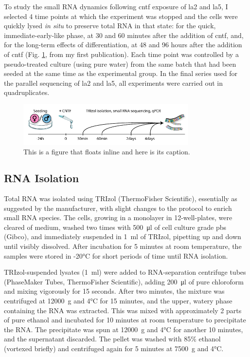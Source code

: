 To study the small RNA dynamics following \ac{cntf} exposure of \ac{la2} and \ac{la5}, I selected 4 time points at which the experiment was stopped and the cells were quickly lysed \textit{in situ} to preserve total RNA in that state: for the quick, immediate-early-like phase, at 30 and 60 minutes after the addition of \ac{cntf}, and, for the long-term effects of differentiation, at 48 and 96 hours after the addition of \ac{cntf} (Fig. \ref{fig:timepoints}, from my first publication\cite{Lobentanzer2019a}). Each time point was controlled by a pseudo-treated culture (using pure water) from the same batch that had been seeded at the same time as the experimental group. In the final series used for the parallel sequencing of \ac{la2} and \ac{la5}, all experiments were carried out in quadruplicates. 

\begin{figure}
\centering
\includegraphics[width=0.8\textwidth]{figures/timepoints}
\caption[Short figure name.]{This is a figure that floats inline and here is its caption.
\label{fig:timepoints}}
\end{figure}

\subsection{RNA Isolation}
Total RNA was isolated using TRIzol (ThermoFisher Scientific), essentially as suggested by the manufacturer, with slight changes to the protocol to enrich small RNA species. The cells, growing in a monolayer in 12-well-plates, were cleared of medium, washed two times with \SI{500}{\micro\litre} of cell culture grade \ac{pbs} (Gibco), and immediately suspended in \SI{1}{\milli\litre} of TRIzol, pipetting up and down until visibly dissolved. After incubation for 5 minutes at room temperature, the samples were stored in -20°C for short periods of time until RNA isolation.

TRIzol-suspended lysates (\SI{1}{\milli\litre}) were added to RNA-separation centrifuge tubes (PhaseMaker Tubes, ThermoFisher Scientific), adding \SI{200}{\micro\litre} of pure chloroform and mixing vigorously for 15 seconds. After two minutes, the mixture was centrifuged at \SI{12000}{\g} and 4°C for 15 minutes, and the upper, watery phase containing the RNA was extracted. This was mixed with approximately 2 parts of pure ethanol and incubated for 10 minutes at room temperature to precipitate the RNA. The precipitate was spun at \SI{12000}{\g} and 4°C for another 10 minutes, and the supernatant discarded. The pellet was washed with 85\% ethanol (vortexed briefly) and centrifuged again for 5 minutes at \SI{7500}{\g} and 4°C.

